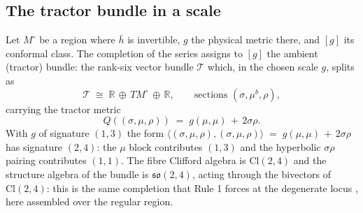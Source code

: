 \documentclass[11pt]{article}
\theoremstyle{definition}
\theoremstyle{plain}
\providecommand{\Cl}{}\renewcommand{\Cl}{\mathrm{Cl}}
\providecommand{\R}{}\renewcommand{\R}{\mathbb{R}}
\providecommand{\hb}{}\renewcommand{\hb}{\bar{h}}
\providecommand{\ip}{}\renewcommand{\ip}[2]{\langle #1, #2\rangle}
\begin{document}
\subsection*{The tractor bundle in a scale}
\label{c:note.interior.setting-tractor-bundle-scale}
Let $M^\circ$ be a region where $\hb$ is invertible, $g$ the physical metric there, and $[g]$ its conformal class. The completion of the series assigns to $[g]$ the ambient (tractor) bundle: the rank-six vector bundle $\mathcal{T}$ which, in the chosen scale $g$, splits as
\[
\mathcal{T} \;\cong\; \R \,\oplus\, TM^\circ \,\oplus\, \R, \qquad \text{sections } (\sigma, \mu^b, \rho),
\]
carrying the tractor metric
\begin{equation}
Q((\sigma,\mu,\rho)) \;=\; g(\mu,\mu) \,+\, 2\sigma\rho .
\end{equation}
With $g$ of signature $(1,3)$ the form $\ip{(\sigma,\mu,\rho)}{(\sigma,\mu,\rho)} \;=\; g(\mu,\mu) \,+\, 2\sigma\rho$ has signature $(2,4)$: the $\mu$ block contributes $(1,3)$ and the hyperbolic $\sigma\rho$ pairing contributes $(1,1)$. The fibre Clifford algebra is $\Cl(2,4)$ and the structure algebra of the bundle is $\mathfrak{so}(2,4)$, acting through the bivectors of $\Cl(2,4)$: this is the same completion that Rule 1 forces at the degenerate locus \cite{ButlerT1, ButlerT4}, here assembled over the regular region.
\end{document}
